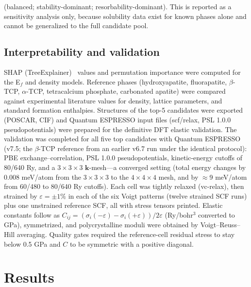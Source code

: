 \documentclass[review,11pt,a4paper]{elsarticle}
\begin{document}
(balanced; stability-dominant; resorbability-dominant). This is reported as a sensitivity analysis only, because solubility data exist for known phases alone and cannot be generalized to the full candidate pool.

\subsection{Interpretability and validation}
SHAP (TreeExplainer)~\cite{lundberg2017} values and permutation importance were computed for the E$_f$ and density models. Reference phases (hydroxyapatite, fluorapatite, $\beta$-TCP, $\alpha$-TCP, tetracalcium phosphate, carbonated apatite) were compared against experimental literature values for density, lattice parameters, and standard formation enthalpies. Structures of the top-5 candidates were exported (POSCAR, CIF) and Quantum ESPRESSO input files (scf/relax, PSL 1.0.0 pseudopotentials) were prepared for the definitive DFT elastic validation. The validation was completed for all five top candidates with Quantum ESPRESSO~\cite{giannozzi2009} (v7.5; the $\beta$-TCP reference from an earlier v6.7 run under the identical protocol): PBE exchange--correlation, PSL 1.0.0 pseudopotentials, kinetic-energy cutoffs of 80/640 Ry, and a $3\times3\times3$ $\mathbf{k}$-mesh---a converged setting (total energy changes by 0.008 meV/atom from the $3\times3\times3$ to the $4\times4\times4$ mesh, and by $\approx$9 meV/atom from 60/480 to 80/640 Ry cutoffs). Each cell was tightly relaxed (vc-relax), then strained by $\varepsilon=\pm1\%$ in each of the six Voigt patterns (twelve strained SCF runs) plus one unstrained reference SCF, all with stress tensors printed. Elastic constants follow as $C_{ij}=(\sigma_i(-\varepsilon)-\sigma_i(+\varepsilon))/2\varepsilon$ (Ry/bohr$^3$ converted to GPa), symmetrized, and polycrystalline moduli were obtained by Voigt--Reuss--Hill averaging. Quality gates required the reference-cell residual stress to stay below 0.5 GPa and $C$ to be symmetric with a positive diagonal.

\section{Results}
\end{document}
